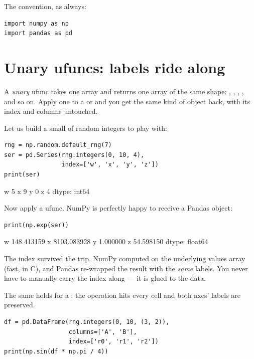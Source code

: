 \documentclass[11pt]{article}
\begin{document}
The convention, as always:

\begin{lstlisting}
import numpy as np
import pandas as pd
\end{lstlisting}

\section{Unary ufuncs: labels ride along}

A \emph{unary} ufunc takes one array and returns one array of the same shape: , , , , and so on. Apply one to a  or  and you get the same kind of object back, with its index and columns untouched.

Let us build a small  of random integers to play with:

\begin{lstlisting}
rng = np.random.default_rng(7)
ser = pd.Series(rng.integers(0, 10, 4),
                index=['w', 'x', 'y', 'z'])
print(ser)
\end{lstlisting}

\begin{outblock}
w    5
x    9
y    0
z    4
dtype: int64
\end{outblock}

Now apply a ufunc. NumPy is perfectly happy to receive a Pandas object:

\begin{lstlisting}
print(np.exp(ser))
\end{lstlisting}

\begin{outblock}
w     148.413159
x    8103.083928
y       1.000000
z      54.598150
dtype: float64
\end{outblock}

\begin{keyidea}
The index \code{['w','x','y','z']} survived the trip. NumPy computed  on the underlying values array (fast, in C), and Pandas re-wrapped the result with the \emph{same} labels. You never have to manually carry the index along --- it is glued to the data.
\end{keyidea}

The same holds for a : the operation hits every cell and both axes' labels are preserved.

\begin{lstlisting}
df = pd.DataFrame(rng.integers(0, 10, (3, 2)),
                  columns=['A', 'B'],
                  index=['r0', 'r1', 'r2'])
print(np.sin(df * np.pi / 4))
\end{lstlisting}
\end{document}
